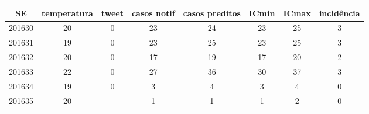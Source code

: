 \begin{tabular}{c|ccccccc}
  \hline
SE & temperatura & tweet & casos notif & casos preditos & ICmin & ICmax & incidência \\ 
  \hline
201630 & 20 & 0 & 23 & 24 & 23 & 25 & 3 \\ 
  201631 & 19 & 0 & 23 & 25 & 23 & 25 & 3 \\ 
  201632 & 20 & 0 & 17 & 19 & 17 & 20 & 2 \\ 
  201633 & 22 & 0 & 27 & 36 & 30 & 37 & 3 \\ 
  201634 & 19 & 0 & 3 & 4 & 3 & 4 & 0 \\ 
  201635 & 20 &  & 1 & 1 & 1 & 2 & 0 \\ 
   \hline
\end{tabular}
